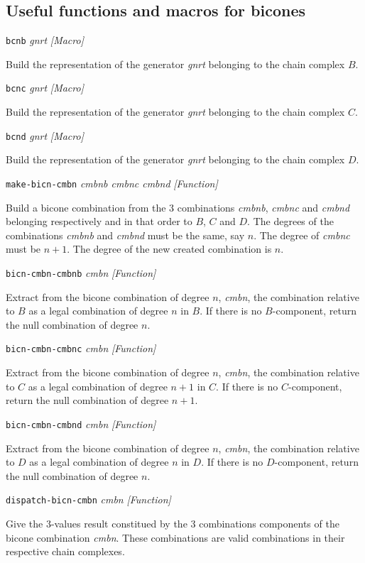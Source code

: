 \newpage

\subsection {Useful functions and macros for bicones}

{\parindent=0mm
{\leftskip=5mm
{\tt bcnb} {\em gnrt} \hfill {\em [Macro]} \par}
{\leftskip=15mm
Build the representation of the generator {\em gnrt} belonging to the chain complex
$B$. \par}{\leftskip=5mm
{\tt bcnc} {\em gnrt} \hfill {\em [Macro]} \par}
{\leftskip=15mm
Build the representation of the generator {\em gnrt} belonging to the chain complex
$C$. \par}{\leftskip=5mm
{\tt bcnd} {\em gnrt} \hfill {\em [Macro]} \par}
{\leftskip=15mm
Build the representation of the generator {\em gnrt} belonging to the chain complex
$D$. \par}
{\leftskip=5mm
{\tt make-bicn-cmbn} {\em cmbnb cmbnc cmbnd} \hfill {\em [Function]} \par}
{\leftskip=15mm
Build a bicone combination from the $3$ combinations {\em cmbnb}, {\em cmbnc} and {\em cmbnd} belonging
respectively and in that order to $B$, $C$ and $D$. The degrees of the combinations {\em cmbnb} and {\em cmbnd}
must be the same, say $n$. The degree of {\em cmbnc} must be $n+1$. The degree of the new created combination
is $n$. \par }
{\leftskip=5mm
{\tt bicn-cmbn-cmbnb} {\em cmbn} \hfill {\em [Function]} \par}
{\leftskip=15mm
Extract from the bicone combination of degree $n$, {\em cmbn}, the combination relative to $B$ as a legal combination
of degree $n$ in $B$. If there is no $B$-component, return the null combination of degree $n$. \par}
{\leftskip=5mm
{\tt bicn-cmbn-cmbnc} {\em cmbn} \hfill {\em [Function]} \par}
{\leftskip=15mm
Extract from the bicone combination of degree $n$, {\em cmbn}, the combination relative to $C$ as a legal combination
of degree $n+1$ in $C$. If there is no $C$-component, return the null combination of degree $n+1$. \par}
{\leftskip=5mm
{\tt bicn-cmbn-cmbnd} {\em cmbn} \hfill {\em [Function]} \par}
{\leftskip=15mm
Extract from the bicone combination of degree $n$, {\em cmbn}, the combination relative to $D$ as a legal combination
of degree $n$ in $D$. If there is no $D$-component, return the null combination of degree $n$. \par}
{\leftskip=5mm
{\tt dispatch-bicn-cmbn} {\em cmbn} \hfill {\em [Function]} \par}
{\leftskip=15mm
Give the $3$-values result constitued by the $3$ combinations components of the bicone combination
{\em cmbn}. These combinations are valid combinations in their respective chain complexes. \par}
}

